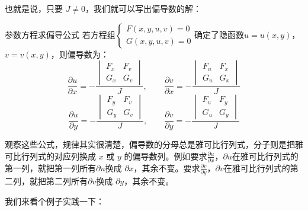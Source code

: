 也就是说，只要 $J \neq 0$，我们就可以写出偏导数的解：
\begin{theorem}{参数方程求偏导公式}{}
  若方程组$\begin{cases}
F(x,y,u,v)=0 \\
G(x,y,u,v)=0
\end{cases}$确定了隐函数$u = u(x,y)$，$v = v(x,y)$，则偏导数为：
\[
\frac{\partial u}{\partial x} = -\frac{\begin{vmatrix}
F_x & F_v \\
G_x & G_v
\end{vmatrix}}{J}
,\qquad
\frac{\partial v}{\partial x} = -\frac{\begin{vmatrix}
F_u & F_x \\
G_u & G_x
\end{vmatrix}}{J}
\]
\[
\frac{\partial u}{\partial y} = -\frac{\begin{vmatrix}
F_y & F_v \\
G_y & G_v
\end{vmatrix}}{J}
,\qquad
\frac{\partial v}{\partial y} = -\frac{\begin{vmatrix}
F_u & F_y \\
G_u & G_y
\end{vmatrix}}{J}
\]
\end{theorem}

观察这些公式，规律其实很清楚，偏导数的分母总是雅可比行列式，分子则是把雅可比行列式的对应列换成 $x$ 或 $y$ 的偏导数列。例如要求$\frac{\partial u}{\partial x}$，$\partial u$在雅可比行列式的第一列，就把第一列所有$\partial u$换成 $\partial x$，其余不变。要求$\frac{\partial v}{\partial y}$，$\partial v$在雅可比行列式的第二列，就把第二列所有$\partial v$换成 $\partial y$，其余不变。

我们来看个例子实践一下：

